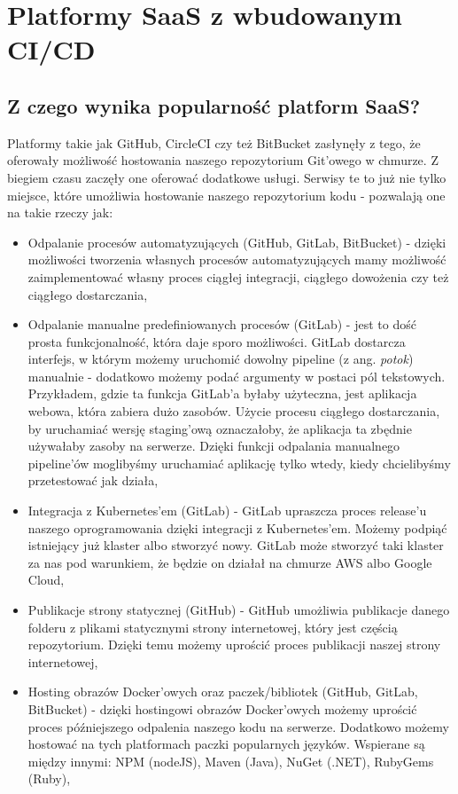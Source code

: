 \section{Platformy SaaS z wbudowanym CI/CD}
\subsection{Z czego wynika popularność platform SaaS?}
Platformy takie jak GitHub, CircleCI czy też BitBucket zasłynęły z tego, że oferowały możliwość hostowania naszego repozytorium Git'owego w chmurze. Z biegiem czasu zaczęły one oferować dodatkowe usługi. Serwisy te to już nie tylko miejsce, które umożliwia hostowanie naszego repozytorium kodu - pozwalają one na takie rzeczy jak:
\begin{itemize}
    \item Odpalanie procesów automatyzujących (GitHub, GitLab, BitBucket) - dzięki możliwości tworzenia własnych procesów automatyzujących mamy możliwość zaimplementować własny proces ciągłej integracji, ciągłego dowożenia czy też ciągłego dostarczania,
    \item Odpalanie manualne predefiniowanych procesów (GitLab) - jest to dość prosta funkcjonalność, która daje sporo możliwości. GitLab dostarcza interfejs, w którym możemy uruchomić dowolny pipeline (z ang. \textit{potok}) manualnie - dodatkowo możemy podać argumenty w postaci pól tekstowych. Przykładem, gdzie ta funkcja GitLab'a byłaby użyteczna, jest aplikacja webowa, która zabiera dużo zasobów. Użycie procesu ciągłego dostarczania, by uruchamiać wersję staging'ową oznaczałoby, że aplikacja ta zbędnie używałaby zasoby na serwerze. Dzięki funkcji odpalania manualnego pipeline'ów moglibyśmy uruchamiać aplikację tylko wtedy, kiedy chcielibyśmy przetestować jak działa,
    \item Integracja z Kubernetes'em (GitLab) - GitLab upraszcza proces release'u naszego oprogramowania dzięki integracji z Kubernetes'em. Możemy podpiąć istniejący już klaster albo stworzyć nowy. GitLab może stworzyć taki klaster za nas pod warunkiem, że będzie on działał na chmurze AWS albo Google Cloud,
    \item Publikacje strony statycznej (GitHub) - GitHub umożliwia publikacje danego folderu z plikami statycznymi strony internetowej, który jest częścią repozytorium. Dzięki temu możemy uprościć proces publikacji naszej strony internetowej,
    \item Hosting obrazów Docker'owych oraz paczek/bibliotek (GitHub, GitLab, BitBucket) - dzięki hostingowi obrazów Docker'owych możemy uprościć proces późniejszego odpalenia naszego kodu na serwerze. Dodatkowo możemy hostować na tych platformach paczki popularnych języków. Wspierane są między innymi: NPM (nodeJS), Maven (Java), NuGet (.NET), RubyGems (Ruby),

\end{itemize}
